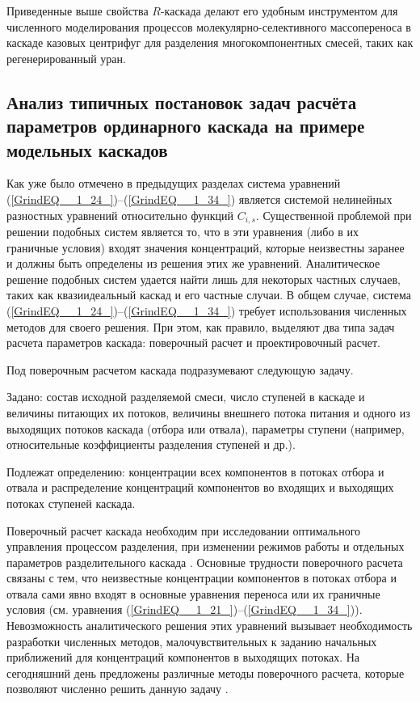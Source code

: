 Приведенные выше свойства $R$-каскада делают его удобным инструментом для численного моделирования процессов молекулярно-селективного массопереноса в каскаде казовых центрифуг для разделения многокомпонентных смесей, таких как регенерированный уран.

\subsection{Анализ типичных постановок задач расчёта параметров ординарного каскада на примере модельных каскадов}\label{part2_discrep}

Как уже было отмечено в предыдущих разделах система уравнений (\ref{GrindEQ__1_24_})--(\ref{GrindEQ__1_34_}) является системой нелинейных разностных уравнений относительно функций $C_{i,s}$. Существенной проблемой при решении подобных систем является то, что в эти уравнения (либо в их граничные условия) входят значения концентраций, которые неизвестны заранее и должны быть определены из решения этих же уравнений. Аналитическое решение подобных систем удается найти лишь для некоторых частных случаев, таких как квазиидеальный каскад и его частные случаи. В общем случае, система (\ref{GrindEQ__1_24_})--(\ref{GrindEQ__1_34_}) требует использования численных методов для своего решения. При этом, как правило, выделяют два типа задач расчета параметров каскада: поверочный расчет и проектировочный расчет.

Под поверочным расчетом каскада подразумевают следующую задачу.

Задано: состав исходной разделяемой смеси, число ступеней в каскаде и величины питающих их потоков, величины внешнего потока питания и одного из выходящих потоков каскада (отбора или отвала), параметры ступени (например, относительные коэффициенты разделения ступеней и др.).

Подлежат определению: концентрации всех компонентов в потоках отбора и отвала и распределение концентраций компонентов во входящих и выходящих потоках ступеней каскада. 

Поверочный расчет каскада необходим при исследовании оптимального управления процессом разделения, при изменении режимов работы и отдельных параметров разделительного каскада \cite{sulaberidzeTeoriyaKaskadovDlya2011}. Основные трудности поверочного расчета связаны с тем, что неизвестные концентрации компонентов в потоках отбора и отвала сами явно входят в основные уравнения переноса или их граничные условия (см. уравнения (\ref{GrindEQ__1_21_})--(\ref{GrindEQ__1_34_})). Невозможность аналитического решения этих уравнений вызывает необходимость разработки численных методов, малочувствительных к заданию начальных приближений для концентраций компонентов в выходящих потоках. На сегодняшний день предложены различные методы поверочного расчета, которые позволяют численно решить данную задачу \cite{sulaberidzeTeoriyaKaskadovDlya2011, sazykinUsovershenstvovannyyMetodRascheta1997, wuCalculationMethodsDetermining1988, holpanovEffektivnyyMetodRascheta1998, potapovCalculationSquaredoffCascades1996, zengRobustEfficientCalculation2000}.

